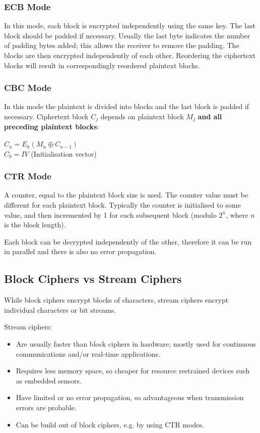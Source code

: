 \documentclass{article}
\begin{document}
\subsubsection{ECB Mode}
In this mode, each block is encrypted independently using the same key. The last block should be padded if necessary. Usually the last byte indicates the number of padding bytes added; this allows the receiver to remove the padding. The blocks are then encrypted independently of each other. Reordering the ciphertext blocks will result in correspondingly reordered plaintext blocks.

\subsubsection{CBC Mode}
In this mode the plaintext is divided into blocks and the last block is padded if necessary. Ciphertext block $C_{j}$ depends on plaintext block $M_{j}$ \textbf{and all preceding plaintext blocks}:
\begin{center}
	$C_{n} = E_{k}(M_{n} \oplus C_{n-1})$ \\
	$C_{0} = IV$ (Initialisation vector)
\end{center}

\subsubsection{CTR Mode}
A counter, equal to the plaintext block size is used. The counter value must be different for each plaintext block. Typically the counter is initialised to some value, and then incremented by 1 for each subsequent block (modulo $2^{n}$, where $n$ is the block length).

Each block can be decrypted independently of the other, therefore it can be run in parallel and there is also no error propagation.

\subsection{Block Ciphers vs Stream Ciphers}
While block ciphers encrypt blocks of characters, stream ciphers encrypt individual characters or bit streams.

Stream ciphers:
\begin{itemize}
	\item Are usually faster than block ciphers in hardware; mostly used for continuous communications and/or real-time applications.
	\item Requires less memory space, so cheaper for resource restrained devices such as embedded sensors.
	\item Have limited or no error propagation, so advantageous when transmission errors are probable.
	\item Can be build out of block ciphers, e.g. by using CTR modes.
\end{itemize}
\end{document}
